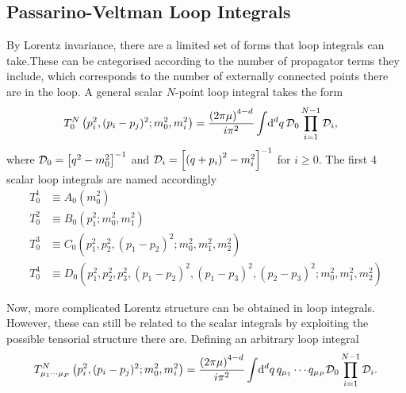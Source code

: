 \begin{draft}
\section{Passarino-Veltman Loop Integrals}
    By Lorentz invariance, there are a limited set of forms that loop integrals can take.
    These can be categorised according to the number of propagator terms they include, which corresponds to the number of externally connected points there are in the loop.
    A general scalar \(N\)-point loop integral takes the form
    \begin{align}
        T^N_0\left(p_i^2, (p_i-p_j)^2; m_0^2, m_i^2\right) & = \frac{\left(2\pi \mu\right)^{4-d}}{i \pi^2} \int\!\mathrm{d}^d q\, \mathcal{D}_0 \prod_{i=1}^{N-1} \mathcal{D}_i,
    \end{align}
    where \(\mathcal{D}_0 = \left[q^2-m_0^2\right]^{-1}\) and \(\mathcal{D}_i = \left[\left(q+p_i\right)^2-m_i^2\right]^{-1}\) for \(i\geq 0\).
    The first 4 scalar loop integrals are named accordingly
    \begin{align}
        T^1_0 & \equiv A_0(m_0^2)                                                                           \\
        T^2_0 & \equiv B_0(p_1^2; m_0^2, m_1^2)                                                             \\
        T^3_0 & \equiv C_0(p_1^2, p_2^2, (p_1-p_2)^2; m_0^2, m_1^2, m_2^2)                                  \\
        T^4_0 & \equiv D_0(p_1^2, p_2^2, p_3^2, (p_1-p_2)^2, (p_1-p_3)^2, (p_2-p_3)^2; m_0^2, m_1^2, m_2^2)
    \end{align}

    \begin{figure}[h!]
        \centering
        \begin{subfigure}{0.49\linewidth}
            \centering
            \caption{}
            \label{qft:fig:PV_boxloop_conventions}
        \end{subfigure}
        \begin{subfigure}{0.49\linewidth}
            \centering
            \caption{}
            \label{qft:fig:PV_triloop_conventions}
        \end{subfigure}
        \caption{}
        \label{qft:fig:PV_loop_conventions}
    \end{figure}

    Now, more complicated Lorentz structure can be obtained in loop integrals.
    However, these can still be related to the scalar integrals by exploiting the possible tensorial structure there are.
    Defining an arbitrary loop integral
    \begin{equation}
        T^N_{\mu_1\cdots\mu_P}\left(p_i^2, (p_i-p_j)^2; m_0^2, m_i^2\right) = \frac{\left(2\pi \mu\right)^{4-d}}{i \pi^2} \int\!\mathrm{d}^d q\, q_{\mu_1}\cdots q_{\mu_P} \mathcal{D}_0 \prod_{i=1}^{N-1} \mathcal{D}_i.
    \end{equation}


\end{draft}
